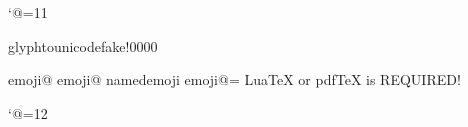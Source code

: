 
\catcode`@=11

\ifdefined\directlua
    
    \pdfextension glyphtounicode{fake!}{0000}
\fi

\ifdefined\pdftexversion
    \def\unemoji@print#1#2{%
        \ifcsname emoji@#2\endcsname%
            \pdfrefximage\csname emoji@#2\endcsname\relax%
        \else%
            \pdfximage named{emoji#2}{#1}%
            \expandafter\chardef\csname emoji@#2\endcsname=\pdflastximage\relax%
            \pdfrefximage\pdflastximage\relax%
        \fi%
    }
\fi

\ifx\unemoji@print\undefined
    \errmessage{%
        LuaTeX or pdfTeX is REQUIRED!%
    }
\fi

\def\emojifont{noto-emoji.pdf}

\def\emoji#1{%
    \unemoji@print{\emojifont}{#1}%
}

\catcode`@=12
\endinput
